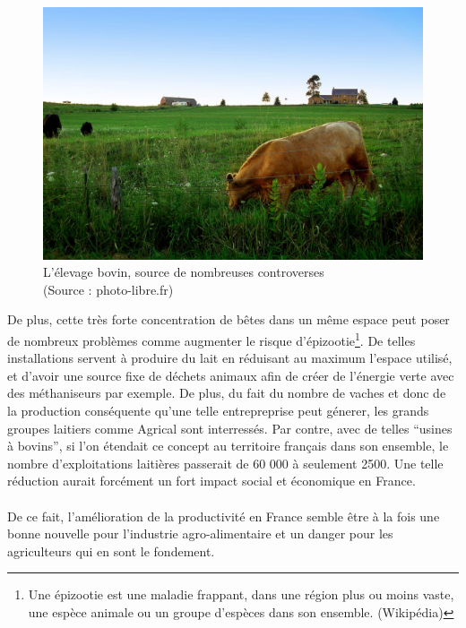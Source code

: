 \documentclass[a4paper,12pt]{report}
\begin{document}
			\begin{figure}[!h]
				\centering
				\includegraphics[scale=1]{Illustrations/Vache.jpg}
				\caption{L'élevage bovin, source de nombreuses controverses\\(Source : photo-libre.fr)}
				\label{Vache}
			\end{figure}
			
			 De plus, cette très forte concentration de bêtes dans un même espace peut poser de nombreux problèmes comme augmenter le risque d'épizootie\footnote{Une épizootie est une maladie frappant, dans une région plus ou moins vaste, une espèce animale ou un groupe d'espèces dans son ensemble. (Wikipédia)}. De telles installations servent à produire du lait en réduisant au maximum l’espace utilisé, et d’avoir une source fixe de déchets animaux afin de créer de l’énergie verte avec des méthaniseurs par exemple. De plus, du fait du nombre de vaches et donc de la production conséquente qu’une telle entrepreprise peut génerer, les grands groupes laitiers comme Agrical sont interressés. Par contre, avec de telles “usines à bovins”, si l’on étendait ce concept au territoire français dans son ensemble, le nombre d’exploitations laitières passerait de 60 000 à seulement 2500. Une telle réduction aurait forcément un fort impact social et économique en France.
			 
		\paragraph{}De ce fait, l'amélioration de la productivité en France semble être à la fois une bonne nouvelle pour l'industrie agro-alimentaire et un danger pour les agriculteurs qui en sont le fondement.
			
\end{document}
